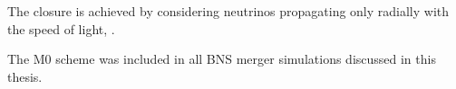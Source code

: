%
%
%
The closure is achieved by considering neutrinos propagating only radially 
with the speed of light, %
\citep{Radice:2016dwd,Radice:2018pdn}.

The M0 scheme was included in all \ac{BNS} merger 
simulations discussed in this thesis.

%



